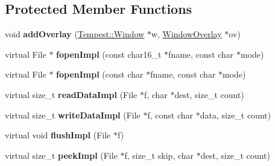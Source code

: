 \subsection*{Protected Member Functions}
\begin{DoxyCompactItemize}
\item 
\hypertarget{class_tempest_1_1_system_a_p_i_a51a9e0057daf5628a86534d78ffa0a89}{void {\bfseries add\+Overlay} (\hyperlink{class_tempest_1_1_window}{Tempest\+::\+Window} $\ast$w, \hyperlink{struct_tempest_1_1_window_overlay}{Window\+Overlay} $\ast$ov)}\label{class_tempest_1_1_system_a_p_i_a51a9e0057daf5628a86534d78ffa0a89}

\item 
\hypertarget{class_tempest_1_1_system_a_p_i_a9457135035e9507ba89eb789405825cc}{virtual File $\ast$ {\bfseries fopen\+Impl} (const char16\+\_\+t $\ast$fname, const char $\ast$mode)}\label{class_tempest_1_1_system_a_p_i_a9457135035e9507ba89eb789405825cc}

\item 
\hypertarget{class_tempest_1_1_system_a_p_i_a7a1affaa41329903bc6daa98bfbfb2a4}{virtual File $\ast$ {\bfseries fopen\+Impl} (const char $\ast$fname, const char $\ast$mode)}\label{class_tempest_1_1_system_a_p_i_a7a1affaa41329903bc6daa98bfbfb2a4}

\item 
\hypertarget{class_tempest_1_1_system_a_p_i_a7d4acb6508bb92060abee458a79d452d}{virtual size\+\_\+t {\bfseries read\+Data\+Impl} (File $\ast$f, char $\ast$dest, size\+\_\+t count)}\label{class_tempest_1_1_system_a_p_i_a7d4acb6508bb92060abee458a79d452d}

\item 
\hypertarget{class_tempest_1_1_system_a_p_i_ab0d619b7aedd8c46da585c6960d24b9c}{virtual size\+\_\+t {\bfseries write\+Data\+Impl} (File $\ast$f, const char $\ast$data, size\+\_\+t count)}\label{class_tempest_1_1_system_a_p_i_ab0d619b7aedd8c46da585c6960d24b9c}

\item 
\hypertarget{class_tempest_1_1_system_a_p_i_a9ee37d48be9b4ba42f9885063631a00d}{virtual void {\bfseries flush\+Impl} (File $\ast$f)}\label{class_tempest_1_1_system_a_p_i_a9ee37d48be9b4ba42f9885063631a00d}

\item 
\hypertarget{class_tempest_1_1_system_a_p_i_a8a7fcc7040a8803540e106e5c8991281}{virtual size\+\_\+t {\bfseries peek\+Impl} (File $\ast$f, size\+\_\+t skip, char $\ast$dest, size\+\_\+t count)}\label{class_tempest_1_1_system_a_p_i_a8a7fcc7040a8803540e106e5c8991281}


\end{DoxyCompactItemize}
